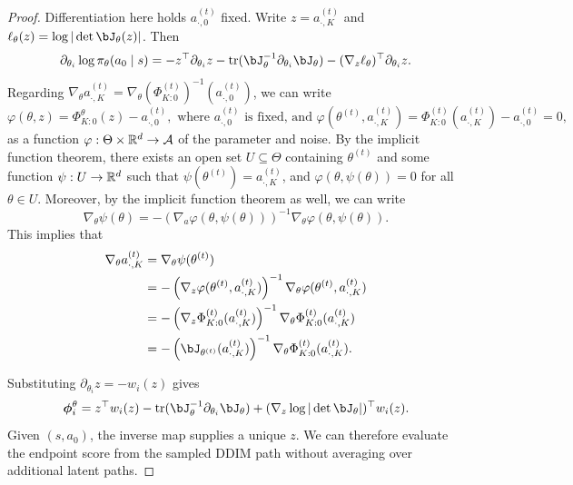 \begin{proof}
    Differentiation here holds $a_{\cdot,0}^{(t)}$ fixed. Write
$z=a_{\cdot,K}^{(t)}$ and $\ell_\theta(z)=\log|\det\bJ_\theta(z)|$. Then
\[
\partial_{\theta_i}\log\pi_\theta(a_0\mid s)
=-z^\top\partial_{\theta_i}z
-\operatorname{tr}(\bJ_\theta^{-1}\partial_{\theta_i}\bJ_\theta)
-(\nabla_z\ell_\theta)^\top\partial_{\theta_i}z.
\]
    Regarding $\nabla_\theta a_{\cdot,K}^{(t)} = \nabla_\theta \left(\Phi^{(t)}_{K:0}\right)^{-1}(a_{\cdot,0}^{(t)})$, we can write $$\varphi(\theta, z) = \Phi^{\theta}_{K:0}(z) - a_{\cdot,0}^{(t)}, \text{ where $a_{\cdot,0}^{(t)}$ is fixed, and } \varphi(\theta^{(t)}, a_{\cdot,K}^{(t)}) = \Phi^{(t)}_{K:0}(a_{\cdot,K}^{(t)}) - a_{\cdot,0}^{(t)} = 0,$$
    as a function $\varphi : \Theta \times {\mathbb{R}}^d \to {\mathcal{A}}$ of the parameter and noise. By the implicit function theorem, there exists an open set $U \subseteq \Theta$ containing $\theta^{(t)}$ and some function $\psi : U \to {\mathbb{R}}^d$ such that $\psi(\theta^{(t)}) = a_{\cdot,K}^{(t)}$, and $\varphi(\theta, \psi(\theta)) = 0$ for all $\theta \in U$.
    Moreover, by the implicit function theorem as well, we can write
    $$\nabla_\theta \psi(\theta) = -\left(\nabla_a \varphi(\theta, \psi(\theta))\right)^{-1} \nabla_\theta \varphi(\theta, \psi(\theta)).$$
    This implies that
    \begin{align*}
        \nabla_\theta a_{\cdot,K}^{(t)}
        &= \nabla_\theta \psi(\theta^{(t)}) \\
        &= - \left(\nabla_z \varphi(\theta^{(t)}, a_{\cdot,K}^{(t)})\right)^{-1} \nabla_\theta \varphi(\theta^{(t)}, a_{\cdot,K}^{(t)}) \\
        &= -\left(\nabla_z \Phi^{(t)}_{K:0}(a_{\cdot,K}^{(t)})\right)^{-1} \nabla_\theta \Phi^{(t)}_{K:0}(a_{\cdot,K}^{(t)}) \\
        &= -\left(\bJ_{\theta^{(t)}}(a_{\cdot,K}^{(t)})\right)^{-1} \nabla_\theta \Phi^{(t)}_{K:0}(a_{\cdot,K}^{(t)}).
    \end{align*}

    Substituting $\partial_{\theta_i}z=-w_i(z)$ gives
\[
\bphi_i^\theta=z^\top w_i(z)
-\operatorname{tr}(\bJ_\theta^{-1}\partial_{\theta_i}\bJ_\theta)
+(\nabla_z\log|\det\bJ_\theta|)^\top w_i(z).
\]
Given $(s,a_0)$, the inverse map supplies a unique $z$. We can therefore
evaluate the endpoint score from the sampled DDIM path without averaging over
additional latent paths.
\end{proof}

